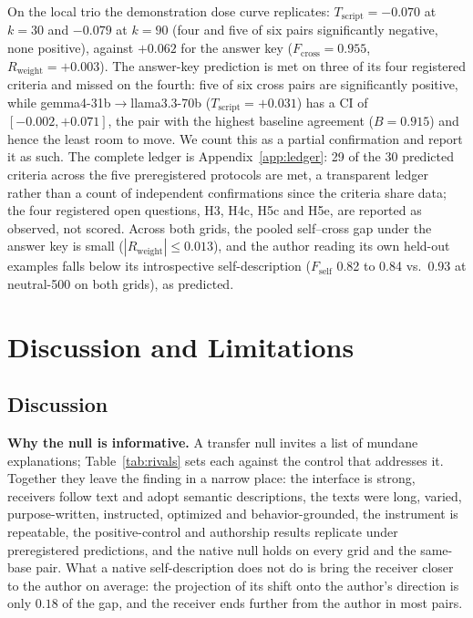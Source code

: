 \documentclass[11pt]{article}
\newcommand{\Fself}{F_{\mathrm{self}}}
\newcommand{\Fcross}{F_{\mathrm{cross}}}
\newcommand{\B}{B}
\newcommand{\Tscript}{T_{\mathrm{script}}}
\newcommand{\Rweight}{R_{\mathrm{weight}}}
\begin{document}
On the local trio the demonstration dose curve replicates: $\Tscript = -0.070$
at $k=30$ and $-0.079$ at $k=90$ (four and five of six pairs significantly
negative, none positive), against $+0.062$ for the answer key
($\Fcross = 0.955$, $\Rweight = +0.003$). The answer-key prediction is met on
three of its four registered criteria and missed on the fourth: five of six
cross pairs are significantly positive, while gemma4-31b$\to$llama3.3-70b
($\Tscript = +0.031$) has a CI of $[-0.002, +0.071]$, the pair with the
highest baseline agreement ($\B = 0.915$) and hence the least room to move.
We count this as a partial confirmation and report it as such. The complete
ledger is Appendix~\ref{app:ledger}: 29 of the 30 predicted criteria across
the five preregistered protocols are met, a transparent ledger rather than a
count of independent confirmations since the criteria share data; the four
registered open questions, H3, H4c, H5c and H5e, are reported as observed,
not scored. Across both
grids, the pooled self--cross gap under the answer key is small
($|\Rweight| \le 0.013$), and the author reading its own held-out examples
falls below its introspective self-description ($\Fself$ 0.82 to 0.84 vs.\
0.93 at neutral-500 on both grids), as predicted.

\section{Discussion and Limitations}
\subsection*{Discussion}
\textbf{Why the null is informative.} A transfer null invites a list of
mundane explanations; Table~\ref{tab:rivals} sets each against the control
that addresses it. Together they leave the finding in a narrow place: the
interface is strong, receivers follow text and adopt semantic descriptions,
the texts were long, varied, purpose-written, instructed, optimized and
behavior-grounded, the instrument is repeatable, the positive-control and
authorship results replicate under preregistered predictions, and the
native null holds on every grid and the same-base pair. What a native
self-description does not do is bring the receiver closer to the author on
average: the projection of its shift onto the author's direction is only
$0.18$ of the gap, and
the receiver ends further from the author in most pairs.
\end{document}
